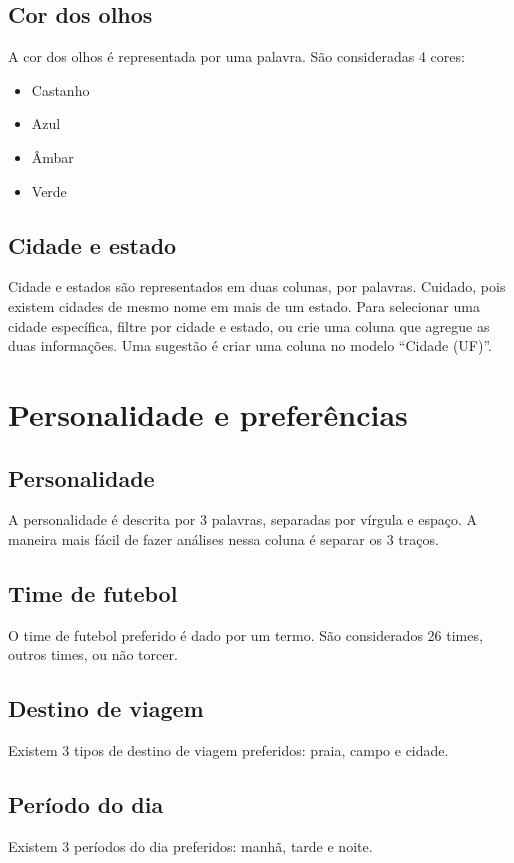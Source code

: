 \documentclass{book}
\begin{document}
\subsection{Cor dos olhos}
A cor dos olhos é representada por uma palavra. São consideradas 4 cores:
\begin{itemize}
  \item Castanho
  \item Azul
  \item Âmbar
  \item Verde
\end{itemize}

\subsection{Cidade e estado}
Cidade e estados são representados em duas colunas, por palavras. Cuidado, pois existem cidades de mesmo nome em mais de um estado. Para selecionar uma cidade específica, filtre por cidade e estado, ou crie uma coluna que agregue as duas informações. Uma sugestão é criar uma coluna no modelo ``Cidade (UF)''.

\section{Personalidade e preferências}

\subsection{Personalidade}
A personalidade é descrita por 3 palavras, separadas por vírgula e espaço. A maneira mais fácil de fazer análises nessa coluna é separar os 3 traços.

\subsection{Time de futebol}
O time de futebol preferido é dado por um termo. São considerados 26 times, outros times, ou não torcer.

\subsection{Destino de viagem}
Existem 3 tipos de destino de viagem preferidos: praia, campo e cidade.

\subsection{Período do dia}
Existem 3 períodos do dia preferidos: manhã, tarde e noite.
\end{document}
